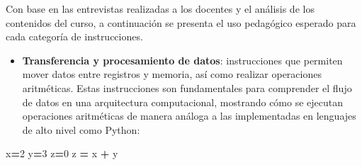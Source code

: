 \documentclass[12pt,oneside]{templates/unerthesis}
\newenvironment{Shaded}{\begin{snugshade}}{\end{snugshade}}
\newcommand{\DecValTok}[1]{\textcolor[rgb]{0.00,0.00,0.81}{#1}}
\newcommand{\NormalTok}[1]{#1}
\newcommand{\OperatorTok}[1]{\textcolor[rgb]{0.81,0.36,0.00}{\textbf{#1}}}
\providecommand{\tightlist}{%
  \setlength{\itemsep}{0pt}\setlength{\parskip}{0pt}}
\begin{document}
\begin{table}[!h]
\centering
\caption{\label{tab:saltoscondicionales}Saltos condicionales: instrucciones y condiciones}
\centering
{}
\end{table}

Con base en las entrevistas realizadas a los docentes y el análisis de los contenidos del curso, a continuación se presenta el uso pedagógico esperado para cada categoría de instrucciones.

\begin{itemize}
\tightlist
\item
  \textbf{Transferencia y procesamiento de datos}: instrucciones que permiten mover datos entre registros y memoria, así como realizar operaciones aritméticas. Estas instrucciones son fundamentales para comprender el flujo de datos en una arquitectura computacional, mostrando cómo se ejecutan operaciones aritméticas de manera análoga a las implementadas en lenguajes de alto nivel como Python:
\end{itemize}

\begin{Shaded}
\begin{Highlighting}[]
\NormalTok{x}\OperatorTok{=}\DecValTok{2}
\NormalTok{y}\OperatorTok{=}\DecValTok{3}
\NormalTok{z}\OperatorTok{=}\DecValTok{0}
\NormalTok{z }\OperatorTok{=}\NormalTok{ x }\OperatorTok{+}\NormalTok{ y}
\end{Highlighting}
\end{Shaded}
\end{document}
